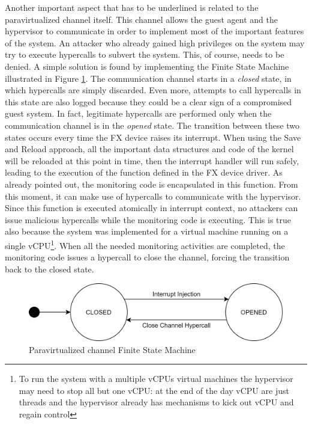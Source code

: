 \par %
Another important aspect that has to be underlined is related to the paravirtualized channel itself. This channel allows the guest agent and the hypervisor to communicate in order to implement most of the important features of the system. An attacker who already gained high privileges on the system may try to execute hypercalls to subvert the system. This, of course, needs to be denied. A simple solution is found by implementing the Finite State Machine illustrated in Figure \ref{fig:paravirt-channel}. The communication channel starts in a \emph{closed} state, in which hypercalls are simply discarded. Even more, attempts to call hypercalls in this state are also logged because they could be a clear sign of a compromised guest system. In fact, legitimate hypercalls are performed only when the communication channel is in the \emph{opened} state. The transition between these two states occurs every time the FX device raises its interrupt. When using the Save and Reload approach, all the important data structures and code of the kernel will be reloaded at this point in time, then the interrupt handler will run safely, leading to the execution of the function defined in the FX device driver. As already pointed out, the monitoring code is encapsulated in this function. From this moment, it can make use of hypercalls to communicate with the hypervisor. Since this function is executed atomically in interrupt context, no attackers can issue malicious hypercalls while the monitoring code is executing. This is true also because the system was implemented for a virtual machine running on a single vCPU\footnote{To run the system with a multiple vCPUs virtual machines the hypervisor may need to stop all but one vCPU: at the end of the day vCPU are just threads and the hypervisor already has mechanisms to kick out vCPU and regain control}. When all the needed monitoring activities are completed, the monitoring code issues a hypercall to close the channel, forcing the transition back to the closed state.

\begin{figure}[t]
    \centering
    \includegraphics{images/paravirt-channel.png}
    \caption{Paravirtualized channel Finite State Machine}
    \label{fig:paravirt-channel}
\end{figure}


